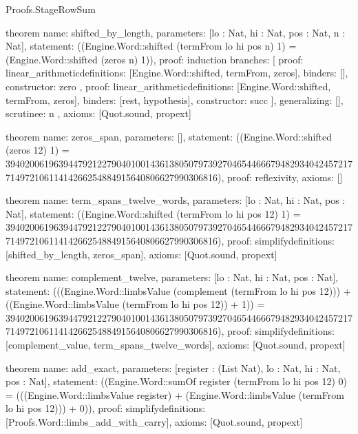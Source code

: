 \begin{lexlean}{Proofs.StageRowSum}
\begin{semanticmodule}
theorem{
  name: shifted_by_length,
  parameters: [lo : Nat, hi : Nat, pos : Nat, n : Nat],
  statement: ((Engine.Word::shifted (termFrom lo hi pos n) 1) = (Engine.Word::shifted (zeros n) 1)),
  proof: induction{
    branches: [
      {
        proof: linear_arithmetic{definitions: [Engine.Word::shifted, termFrom, zeros]},
        binders: [],
        constructor: zero
      },
      {
        proof: linear_arithmetic{definitions: [Engine.Word::shifted, termFrom, zeros]},
        binders: [rest, hypothesis],
        constructor: succ
      }
    ],
    generalizing: [],
    scrutinee: n
  },
  axioms: [Quot.sound, propext]
}

theorem{
  name: zeros_span,
  parameters: [],
  statement: ((Engine.Word::shifted (zeros 12) 1) = 39402006196394479212279040100143613805079739270465446667948293404245721771497210611414266254884915640806627990306816),
  proof: reflexivity{},
  axioms: []
}

theorem{
  name: term_spans_twelve_words,
  parameters: [lo : Nat, hi : Nat, pos : Nat],
  statement: ((Engine.Word::shifted (termFrom lo hi pos 12) 1) = 39402006196394479212279040100143613805079739270465446667948293404245721771497210611414266254884915640806627990306816),
  proof: simplify{definitions: [shifted_by_length, zeros_span]},
  axioms: [Quot.sound, propext]
}

theorem{
  name: complement_twelve,
  parameters: [lo : Nat, hi : Nat, pos : Nat],
  statement: (((Engine.Word::limbsValue (complement (termFrom lo hi pos 12))) + ((Engine.Word::limbsValue (termFrom lo hi pos 12)) + 1)) = 39402006196394479212279040100143613805079739270465446667948293404245721771497210611414266254884915640806627990306816),
  proof: simplify{definitions: [complement_value, term_spans_twelve_words]},
  axioms: [Quot.sound, propext]
}

theorem{
  name: add_exact,
  parameters: [register : (List Nat), lo : Nat, hi : Nat, pos : Nat],
  statement: ((Engine.Word::sumOf register (termFrom lo hi pos 12) 0) = (((Engine.Word::limbsValue register) + (Engine.Word::limbsValue (termFrom lo hi pos 12))) + 0)),
  proof: simplify{definitions: [Proofs.Word::limbs_add_with_carry]},
  axioms: [Quot.sound, propext]
}


\end{semanticmodule}
\end{lexlean}

